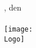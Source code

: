 \begin{titlepage}

\begin{center}
\LARGE{\betreff}\\[4ex]
\huge{\textbf{\titel}}\\[1.5ex]
\Large{\textbf{\untertitel}}\\[4ex]
\normalsize
\abgabeOrt, den \abgabeTermin\\[3em]
\autorName\\[6em]
\texttt{[image: \\Logo]}\\
\end{center}

\end{titlepage}
